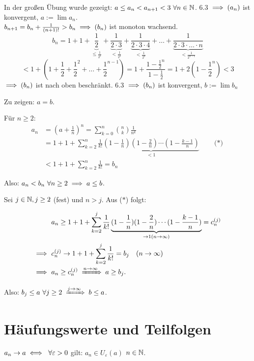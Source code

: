 \documentclass[a4paper,oneside,DIV15,BCOR12mm]{scrbook}
\begin{document}
\begin{beweis}
In der großen Übung wurde gezeigt: $a\le a_n < a_{n+1} < 3\ \forall n\in\mathbb{N}$. 6.3 $\implies(a_n)$ ist konvergent, $a:=\lim a_n$.\\
$b_{n+1} = b_n + \frac{1}{(n+1)!} > b_n \implies (b_n)$ ist monoton wachsend.
$$b_n = 1+ 1+ \underbrace{\frac{1}{2}}_{\le\frac{1}{2^1}} + \underbrace{\frac{1}{2\cdot3}}_{<\frac{1}{2^2}} + \underbrace {\frac{1}{2\cdot 3\cdot 4}}_{< \frac{1}{2^3}}+\ldots+ \underbrace{\frac{1}{2\cdot3\cdot\ldots\cdot n}}_{< \frac{1}{2^{n-1}}} $$
$$ < 1+ (1+ \frac{1}{2} + \frac{1}{2}^2 + \ldots + \frac{1}{2}^{n-1}) = 1+ \frac{1-\frac{1}{2}^n}{1-\frac{1}{2}} = 1+ 2(1-\frac{1}{2}^n) < 3$$
$\implies (b_n)$ ist nach oben beschränkt. 6.3 $\implies (b_n)$ ist konvergent, $b:=\lim b_n$

Zu zeigen: $a=b$.

Für $n\ge2$:
\begin{align*}
a_n&=(a+\frac{1}{n})^n=\sum_{k=0}^n{\binom{n}{k}\frac{1}{n^k}} \\
&=1+1+\sum_{k=2}^{n}{\frac{1}{k!}\underbrace{(1-\frac{1}{n})(1-\frac{2}{n})\cdots(1-\frac{k-1}{n})}_{<1}}\qquad\text{($*$)} \\
&<1+1+\sum_{k=2}^n{\frac{1}{k!}}=b_n
\end{align*}

Also: $a_n<b_n\ \forall n\ge2 \implies a\le b$.

Sei $j\in\mathbb{N}, j\ge 2$ (fest) und $n>j$. Aus ($*$) folgt:


\begin{align*}
& a_n\ge 1+1+\sum_{k=2}^{j}{\frac{1}{k!}\underbrace{(1-\frac{1}{n})(1-\frac{2}{n})\cdots(1-\frac{k-1}{n})}_{\rightarrow 1(n \rightarrow \infty)}} = c_n^{(j)} \\
\folgt\ & c_n^{(j)} \rightarrow 1+1+\sum_{k=2}^j{\frac{1}{k!}}=b_j\quad(n \rightarrow \infty) \\
\folgt\ & a_n\ge c_n^{(j)} \folgtwegen{n \rightarrow \infty} a\ge b_j\text{.} \\
\end{align*}

Also: $b_j\le a\ \forall j\ge 2 \folgtwegen{j \rightarrow \infty} b\le a$.
\end{beweis}

\chapter{Häufungswerte und Teilfolgen}

\begin{erinnerung}
$a_n \to a \iff\ \forall \varepsilon > 0$ gilt: $a_n \in  U_\varepsilon(a)$ \ffa $n \in\mathbb{N}$.
\end{erinnerung}
\end{document}
